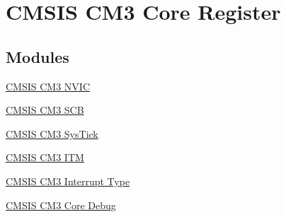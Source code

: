 \hypertarget{group___c_m_s_i_s___c_m3__core__register}{\section{C\-M\-S\-I\-S C\-M3 Core Register}
\label{group___c_m_s_i_s___c_m3__core__register}
}
\subsection*{Modules}
\begin{DoxyCompactItemize}
\item 
\hyperlink{group___c_m_s_i_s___c_m3___n_v_i_c}{C\-M\-S\-I\-S C\-M3 N\-V\-I\-C}
\item 
\hyperlink{group___c_m_s_i_s___c_m3___s_c_b}{C\-M\-S\-I\-S C\-M3 S\-C\-B}
\item 
\hyperlink{group___c_m_s_i_s___c_m3___sys_tick}{C\-M\-S\-I\-S C\-M3 Sys\-Tick}
\item 
\hyperlink{group___c_m_s_i_s___c_m3___i_t_m}{C\-M\-S\-I\-S C\-M3 I\-T\-M}
\item 
\hyperlink{group___c_m_s_i_s___c_m3___interrupt_type}{C\-M\-S\-I\-S C\-M3 Interrupt Type}
\item 
\hyperlink{group___c_m_s_i_s___c_m3___core_debug}{C\-M\-S\-I\-S C\-M3 Core Debug}
\end{DoxyCompactItemize}

